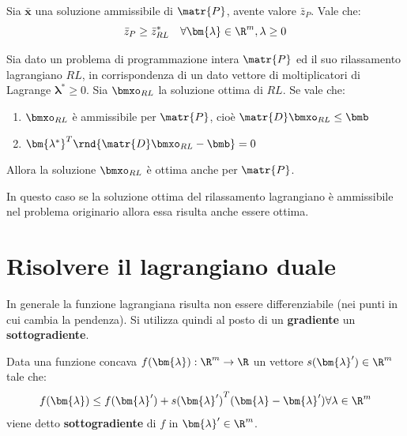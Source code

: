 \documentclass[\main/main.tex]{subfiles}
\begin{document}
\begin{theorem}
    Sia \(\bar{\bm{x}}\) una soluzione ammissibile di \(\matr{P}\), avente valore \(\bar{z}_P\). Vale che:
    \[
        \bar{z}_P \geq \bar{z}^*_{RL} \quad \forall \bm{\lambda} \in \R^m, \lambda \geq 0
    \]\end{theorem}

\begin{theorem}
    Sia dato un problema di programmazione intera \(\matr{P}\) ed il suo rilassamento lagrangiano \(RL\), in corrispondenza di un dato vettore di moltiplicatori di Lagrange \(\bm{\lambda}^*\geq 0\). Sia \(\bmxo_{RL}\) la soluzione ottima di \(RL\). Se vale che:
    \begin{enumerate}
        \item \(\bmxo_{RL}\) è ammissibile per \(\matr{P}\), cioè \(\matr{D}\bmxo_{RL} \leq \bmb \)
        \item \({\bm{\lambda^*}}^T \rnd{\matr{D}\bmxo_{RL}-\bmb}=0\)
    \end{enumerate}
    Allora la soluzione \(\bmxo_{RL}\) è ottima anche per \(\matr{P}\).
\end{theorem}

\begin{corollary}
    In questo caso se la soluzione ottima del rilassamento lagrangiano è ammissibile nel problema originario allora essa risulta anche essere ottima.
\end{corollary}

\section{Risolvere il lagrangiano duale}
In generale la funzione lagrangiana risulta non essere differenziabile (nei punti in cui cambia la pendenza). Si utilizza quindi al posto di un \textbf{gradiente} un \textbf{sottogradiente}.

\begin{definition}[Sottogradiente]
    Data una funzione concava \(f(\bm{\lambda}): \R^m \rightarrow \R \) un vettore \(s(\bm{\lambda}') \in \R^m\) tale che:
    \[
        f(\bm{\lambda}) \leq f(\bm{\lambda}') + {s(\bm{\lambda}')}^T(\bm{\lambda}-\bm{\lambda}') \forall \lambda \in \R^m
    \]    viene detto \textbf{sottogradiente} di \(f\) in \(\bm{\lambda}' \in \R^m\).
\end{definition}
\end{document}
